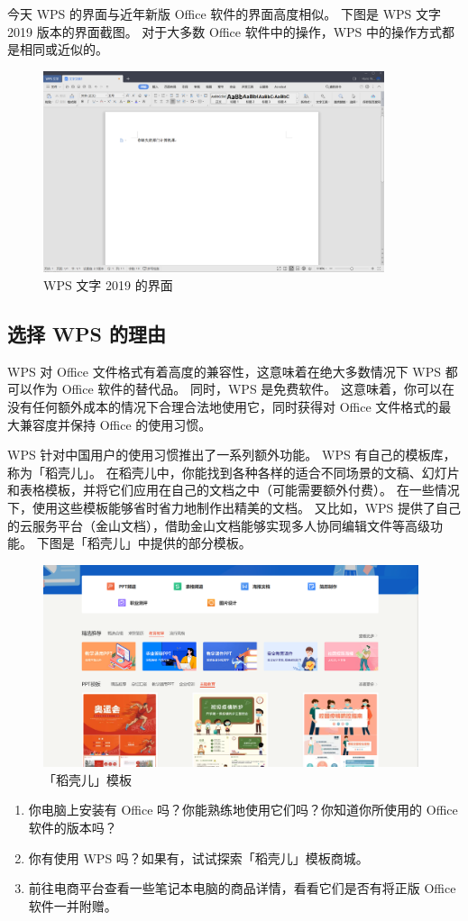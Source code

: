 今天 WPS 的界面与近年新版 Office 软件的界面高度相似。
下图是 WPS 文字 2019 版本的界面截图。
对于大多数 Office 软件中的操作，WPS 中的操作方式都是相同或近似的。

\begin{figure}[htb!]
  \centering
  \includegraphics[width=10cm]{assets/WPS.png}
  \caption{WPS 文字 2019 的界面}
  \label{WPS}
\end{figure}

\subsection{选择 WPS 的理由}

WPS 对 Office 文件格式有着高度的兼容性，这意味着在绝大多数情况下 WPS 都可以作为 Office 软件的替代品。
同时，WPS 是免费软件。
这意味着，你可以在没有任何额外成本的情况下合理合法地使用它，同时获得对 Office 文件格式的最大兼容度并保持 Office 的使用习惯。

WPS 针对中国用户的使用习惯推出了一系列额外功能。
WPS 有自己的模板库，称为「稻壳儿」。
在稻壳儿中，你能找到各种各样的适合不同场景的文稿、幻灯片和表格模板，并将它们应用在自己的文档之中（可能需要额外付费）。
在一些情况下，使用这些模板能够省时省力地制作出精美的文档。
又比如，WPS 提供了自己的云服务平台（金山文档），借助金山文档能够实现多人协同编辑文件等高级功能。
下图是「稻壳儿」中提供的部分模板。

\begin{figure}[htb!]
  \centering
  \includegraphics[width=11cm]{assets/WPS_Template.png}
  \caption{「稻壳儿」模板}
  \label{WPS_Template}
\end{figure}

\practice

\begin{enumerate}
  \item 你电脑上安装有 Office 吗？你能熟练地使用它们吗？你知道你所使用的 Office 软件的版本吗？
  \item 你有使用 WPS 吗？如果有，试试探索「稻壳儿」模板商城。
  \item 前往电商平台查看一些笔记本电脑的商品详情，看看它们是否有将正版 Office 软件一并附赠。
\end{enumerate}